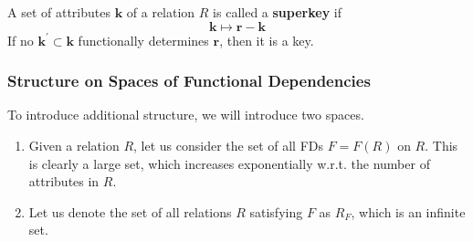 \documentclass{article}
\begin{document}
    \begin{definition}[Superkey]
      A set of attributes $\mathbf{k}$ of a relation $R$ is called a \textbf{superkey} if 
      \begin{equation}
        \mathbf{k} \mapsto \mathbf{r} - \mathbf{k}
      \end{equation}
      If no $\mathbf{k}^\prime \subset \mathbf{k}$ functionally determines $\mathbf{r}$, then it is a key. 
    \end{definition}

    \subsubsection{Structure on Spaces of Functional Dependencies}

      To introduce additional structure, we will introduce two spaces. 
      \begin{enumerate}
        \item Given a relation $R$, let us consider the set of all FDs $F = F(R)$ on $R$. This is clearly a large set, which increases exponentially w.r.t. the number of attributes in $R$. 
        \item Let us denote the set of all relations $R$ satisfying $F$ as $R_F$, which is an infinite set. 
      \end{enumerate}
\end{document}
